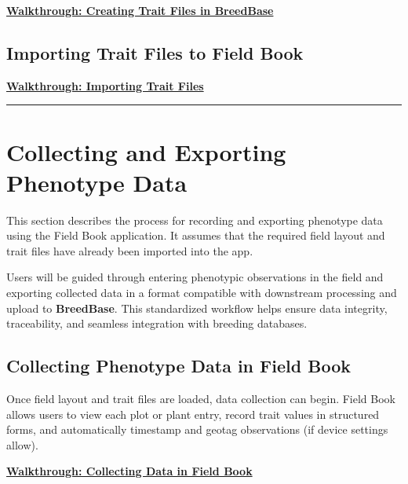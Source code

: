 \documentclass[
  12pt,
]{book}
\begin{document}
\href{https://scribehow.com/shared/Creating_a_Field_Book_Trait_File_in_BreedBase__AQKYEuyXRzK1H1lRFm--3Q}{\textbf{Walkthrough: Creating Trait Files in BreedBase}}

\hypertarget{importing-trait-files-to-field-book}{%
\subsection{Importing Trait Files to Field Book}\label{importing-trait-files-to-field-book}}

\href{https://scribehow.com/shared/Importing_Trait_Files_into_Field_Book__LuVCpgtfQCeDtWEl7xbZVw}{\textbf{Walkthrough: Importing Trait Files}}

\begin{center}\rule{0.5\linewidth}{0.5pt}\end{center}

\hypertarget{collecting-and-exporting-phenotype-data}{%
\section{Collecting and Exporting Phenotype Data}\label{collecting-and-exporting-phenotype-data}}

This section describes the process for recording and exporting phenotype data using the Field Book application. It assumes that the required field layout and trait files have already been imported into the app.

Users will be guided through entering phenotypic observations in the field and exporting collected data in a format compatible with downstream processing and upload to \textbf{BreedBase}. This standardized workflow helps ensure data integrity, traceability, and seamless integration with breeding databases.

\hypertarget{collecting-phenotype-data-in-field-book}{%
\subsection{Collecting Phenotype Data in Field Book}\label{collecting-phenotype-data-in-field-book}}

Once field layout and trait files are loaded, data collection can begin. Field Book allows users to view each plot or plant entry, record trait values in structured forms, and automatically timestamp and geotag observations (if device settings allow).

\href{https://scribehow.com/shared/Collecting_Data_in_Fieldbook__hIsZkb9xSnKcLW65gN60lA}{\textbf{Walkthrough: Collecting Data in Field Book}}
\end{document}
